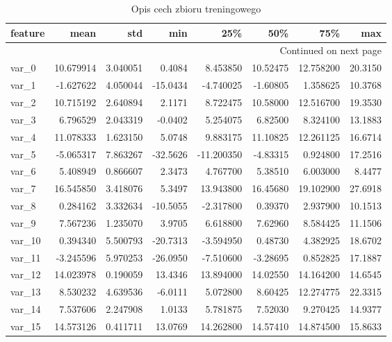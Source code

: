 \documentclass[12pt]{article}
\begin{document}
\begin{longtable}{lrrrrrrr}
\toprule
 feature &       mean &        std &      min &        25\% &       50\% &        75\% &      max \\
\midrule
\endhead
\midrule
\multicolumn{8}{r}{{Continued on next page}} \\
\midrule
\caption{Opis cech zbioru treningowego}
\label{traindescribe}
\endfoot

\bottomrule
\endlastfoot
   var\_0 &  10.679914 &   3.040051 &   0.4084 &   8.453850 &  10.52475 &  12.758200 &  20.3150 \\
   var\_1 &  -1.627622 &   4.050044 & -15.0434 &  -4.740025 &  -1.60805 &   1.358625 &  10.3768 \\
   var\_2 &  10.715192 &   2.640894 &   2.1171 &   8.722475 &  10.58000 &  12.516700 &  19.3530 \\
   var\_3 &   6.796529 &   2.043319 &  -0.0402 &   5.254075 &   6.82500 &   8.324100 &  13.1883 \\
   var\_4 &  11.078333 &   1.623150 &   5.0748 &   9.883175 &  11.10825 &  12.261125 &  16.6714 \\
   var\_5 &  -5.065317 &   7.863267 & -32.5626 & -11.200350 &  -4.83315 &   0.924800 &  17.2516 \\
   var\_6 &   5.408949 &   0.866607 &   2.3473 &   4.767700 &   5.38510 &   6.003000 &   8.4477 \\
   var\_7 &  16.545850 &   3.418076 &   5.3497 &  13.943800 &  16.45680 &  19.102900 &  27.6918 \\
   var\_8 &   0.284162 &   3.332634 & -10.5055 &  -2.317800 &   0.39370 &   2.937900 &  10.1513 \\
   var\_9 &   7.567236 &   1.235070 &   3.9705 &   6.618800 &   7.62960 &   8.584425 &  11.1506 \\
  var\_10 &   0.394340 &   5.500793 & -20.7313 &  -3.594950 &   0.48730 &   4.382925 &  18.6702 \\
  var\_11 &  -3.245596 &   5.970253 & -26.0950 &  -7.510600 &  -3.28695 &   0.852825 &  17.1887 \\
  var\_12 &  14.023978 &   0.190059 &  13.4346 &  13.894000 &  14.02550 &  14.164200 &  14.6545 \\
  var\_13 &   8.530232 &   4.639536 &  -6.0111 &   5.072800 &   8.60425 &  12.274775 &  22.3315 \\
  var\_14 &   7.537606 &   2.247908 &   1.0133 &   5.781875 &   7.52030 &   9.270425 &  14.9377 \\
  var\_15 &  14.573126 &   0.411711 &  13.0769 &  14.262800 &  14.57410 &  14.874500 &  15.8633 \\

\end{longtable}
\end{document}
